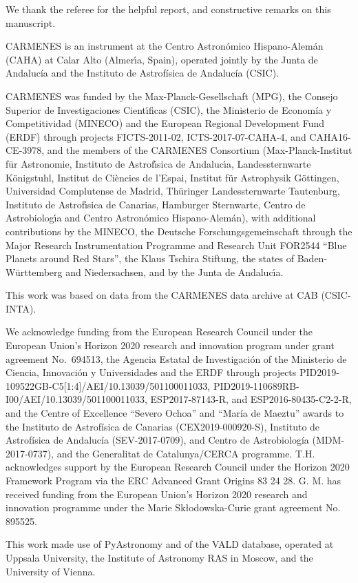 \documentclass{aa}
\begin{document}
\begin{acknowledgements}

We thank the referee for the helpful report, and constructive remarks on this manuscript. 

CARMENES is an instrument at the Centro Astron\'omico Hispano-Alem\'an (CAHA) at Calar Alto (Almer\'{\i}a, Spain), operated jointly by the Junta de Andaluc\'ia and the Instituto de Astrof\'isica de Andaluc\'ia (CSIC).
  
  CARMENES was funded by the Max-Planck-Gesellschaft (MPG), 
  the Consejo Superior de Investigaciones Cient\'{\i}ficas (CSIC),
  the Ministerio de Econom\'ia y Competitividad (MINECO) and the European Regional Development Fund (ERDF) through projects FICTS-2011-02, ICTS-2017-07-CAHA-4, and CAHA16-CE-3978, 
  and the members of the CARMENES Consortium 
  (Max-Planck-Institut f\"ur Astronomie,
  Instituto de Astrof\'{\i}sica de Andaluc\'{\i}a,
  Landessternwarte K\"onigstuhl,
  Institut de Ci\`encies de l'Espai,
  Institut f\"ur Astrophysik G\"ottingen,
  Universidad Complutense de Madrid,
  Th\"uringer Landessternwarte Tautenburg,
  Instituto de Astrof\'{\i}sica de Canarias,
  Hamburger Sternwarte,
  Centro de Astrobiolog\'{\i}a and
  Centro Astron\'omico Hispano-Alem\'an), 
  with additional contributions by the MINECO, 
  the Deutsche Forschungsgemeinschaft through the Major Research Instrumentation Programme and Research Unit FOR2544 ``Blue Planets around Red Stars'', 
  the Klaus Tschira Stiftung, 
  the states of Baden-W\"urttemberg and Niedersachsen, 
  and by the Junta de Andaluc\'{\i}a.
  
  This work was based on data from the CARMENES data archive at CAB (CSIC-INTA).

We acknowledge funding from the European Research Council under the European Union's Horizon 2020 research and innovation program under grant agreement No.~694513, 
the Agencia Estatal de Investigaci\'on of the Ministerio de Ciencia, Innovaci\'on y Universidades and the ERDF through projects 
  PID2019-109522GB-C5[1:4]/AEI/10.13039/501100011033,	%
  PID2019-110689RB-I00/AEI/10.13039/501100011033,
  ESP2017-87143-R, and ESP2016-80435-C2-2-R,
and the Centre of Excellence ``Severo Ochoa'' and ``Mar\'ia de Maeztu'' awards to the Instituto de Astrof\'isica de Canarias (CEX2019-000920-S), Instituto de Astrof\'isica de Andaluc\'ia (SEV-2017-0709), and Centro de Astrobiolog\'ia (MDM-2017-0737), and the Generalitat de Catalunya/CERCA programme. T.H. acknowledges support by the European Research Council under the Horizon 2020 Framework Program via the ERC Advanced Grant Origins 83 24 28. G. M. has received funding from the European Union's Horizon 2020 research and innovation programme under the Marie Skłodowska-Curie grant agreement No. 895525.
  
This work made use of PyAstronomy \citep{PyAstronomy2019ascl.soft06010C} and of the VALD database, operated at Uppsala University, the Institute of Astronomy RAS in Moscow, and the University of Vienna.

\end{acknowledgements}
\end{document}
